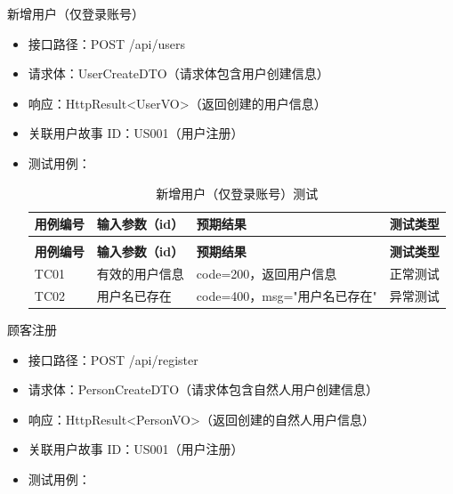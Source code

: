 \begin{levellist}
\begin{levellist}
        \item 新增用户（仅登录账号）
        \begin{itemize}
            \item 接口路径：POST /api/users
            \item 请求体：UserCreateDTO（请求体包含用户创建信息）
            \item 响应：HttpResult<UserVO>（返回创建的用户信息）
            \item 关联用户故事 ID：US001（用户注册）
            \item 测试用例：
                  \begin{longtable}{>{\centering\arraybackslash}m{2cm} >{\centering\arraybackslash}m{4cm} >{\centering\arraybackslash}m{5cm} >{\centering\arraybackslash}m{2cm}}

                      \caption{新增用户（仅登录账号）测试} \label{tab:training}                              \\

                      \toprule
                      \textbf{用例编号} & \textbf{输入参数（id）} & \textbf{预期结果}         & \textbf{测试类型} \\
                      \midrule
                      \endfirsthead

                      \multicolumn{4}{c}{{\tablename\ \thetable{} 续表}}                          \\
                      \toprule
                      \textbf{用例编号} & \textbf{输入参数（id）} & \textbf{预期结果}         & \textbf{测试类型} \\
                      \midrule
                      \endhead

                      \bottomrule
                      \endfoot

                      TC01          & 有效的用户信息           & code=200，返回用户信息       & 正常测试          \\
                      TC02          & 用户名已存在            & code=400，msg="用户名已存在" & 异常测试          \\
                  \end{longtable}
        \end{itemize}

        \item 顾客注册
        \begin{itemize}
            \item 接口路径：POST /api/register
            \item 请求体：PersonCreateDTO（请求体包含自然人用户创建信息）
            \item 响应：HttpResult<PersonVO>（返回创建的自然人用户信息）
            \item 关联用户故事 ID：US001（用户注册）
            \item 测试用例：
                  \begin{longtable}{>{\centering\arraybackslash}m{2cm} >{\centering\arraybackslash}m{5cm} >{\centering\arraybackslash}m{4cm} >{\centering\arraybackslash}m{2cm}}


\end{longtable}
\end{itemize}
\end{levellist}
\end{levellist}

